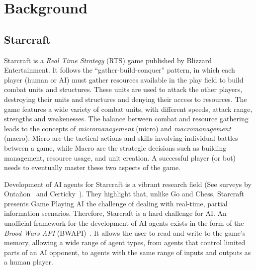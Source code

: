 \section{Background}\label{section:background}

\subsection{Starcraft}

Starcraft is a \emph{Real Time Strategy} (RTS) game published by
Blizzard Entertainment. It follows the ``gather-build-conquer''
pattern, in which each player (human or AI) must gather resources
available in the play field to build combat units and
structures. These units are used to attack the other players,
destroying their units and structures and denying their access to
resources. The game features a wide variety of combat units, with
different speeds, attack range, strengths and weakenesses. The balance
between combat and resource gathering leads to the concepts of
\emph{micromanagement} (micro) and \emph{macromanagement}
(macro). Micro are the tactical actions and skills involving
individual battles between a game, while Macro are the strategic
decisions such as building management, resource usage, and unit
creation. A successful player (or bot) needs to eventually master
these two aspects of the game.

Development of AI agents for Starcraft is a vibrant research field
(See surveys by Onta\~non~\cite{Ontanon13AICompetitionSurvey} and
Certicky~\cite{Certicky17SurveyCompetitionsBots}). They highlight that, unlike Go and Chess,
Starcraft presents Game Playing AI the challenge of dealing with
real-time, partial information scenarios. Therefore, Starcraft is a
hard challenge for AI. An unofficial framework for the development of
AI agents exists in the form of the \emph{Brood Wars API}
(BWAPI)~\cite{BWAPI}. It allows the user to read and write to the
game's memory, allowing a wide range of agent types, from agents that
control limited parts of an AI opponent, to agents with the same range
of inputs and outputs as a human player.


